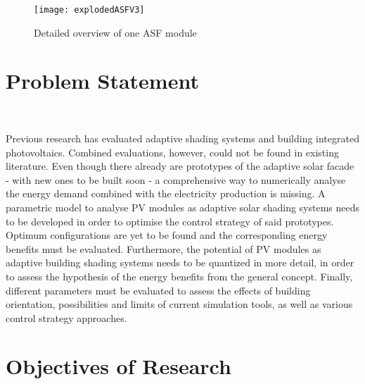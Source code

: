 	\begin{figure}[ht] %
		\begin{center}
		\texttt{[image: explodedASFV3]}
		\caption{Detailed overview of one ASF module \cite{nagy2016}}
		\label{fig:exploded}
		\end{center} 
	\end{figure}


	\section{Problem Statement}\

	Previous research has evaluated adaptive shading systems and building integrated photovoltaics. Combined evaluations, however, could not be found in existing literature. Even though there already are prototypes of the adaptive solar facade - with new ones to be built soon - a comprehensive way to numerically analyse the energy demand combined with the electricity production is missing. A parametric model to analyse PV modules as adaptive solar shading systems needs to be developed in order to optimise the control strategy of said prototypes. Optimum configurations are yet to be found and the corresponding energy benefits must be evaluated. Furthermore, the potential of PV modules as adaptive building shading systems needs to be quantized in more detail, in order to assess the hypothesis of the energy benefits from the general concept. Finally, different parameters must be evaluated to assess the effects of building orientation, possibilities and limits of current simulation tools, as well as various control strategy approaches.




\section{Objectives of Research}\

